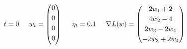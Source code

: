 \documentclass{article}
\begin{document}
$$t=0 \hspace{0.5cm} 
 w_{t} = \begin{pmatrix}
  0 \vspace{0.1cm} \\
  0 \vspace{0.1cm} \\
  0 \vspace{0.1cm} \\
  0 \vspace{0.1cm} \\
\end{pmatrix} \hspace{0.5cm} 
\eta_{t} = 0.1 \hspace{0.5cm}
\nabla L(w) = 
\begin{pmatrix} 
2w_1 + 2 \vspace{0.1cm}\\
4w_2 - 4 \vspace{0.1cm}\\
2w_3 - 2w_4 \vspace{0.1cm}\\
-2w_3 + 2w_4
\end{pmatrix}$$\\
\end{document}
